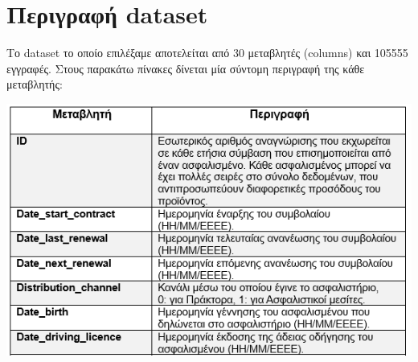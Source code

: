 \documentclass{llncs}
\begin{document}
\section{Περιγραφή dataset}
Το dataset το οποίο επιλέξαμε αποτελείται από 30 μεταβλητές (columns) και 105555 εγγραφές. Στους παρακάτω πίνακες δίνεται μία σύντομη περιγραφή της κάθε μεταβλητής:

\begin{center}
    \includegraphics[width=1\textwidth]{images/variables_1.png}
\end{center}
\end{document}
